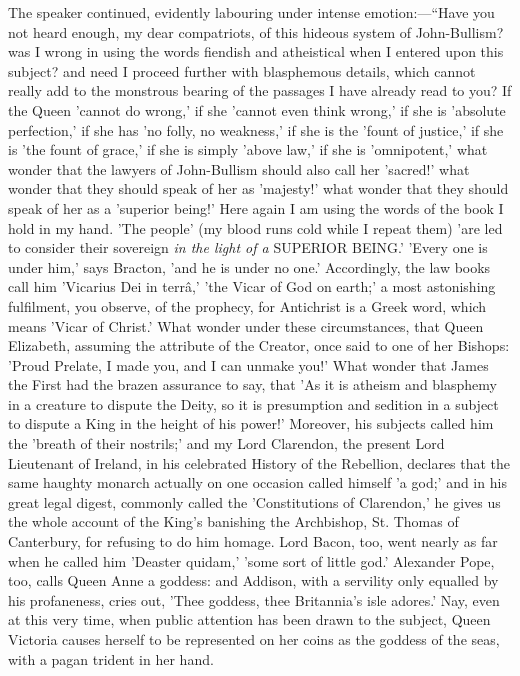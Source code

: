 The speaker continued, evidently labouring under
intense emotion:—``Have you not heard enough, my
dear compatriots, of this hideous system of John-Bullism?
was I wrong in using the words fiendish and atheistical
when I entered upon this subject? and need I proceed
further with blasphemous details, which cannot really add
to the monstrous bearing of the passages I have already
read to you? If the Queen 'cannot do wrong,' if she
'cannot even think wrong,' if she is 'absolute
perfection,' if she has 'no folly, no weakness,' if she
is the 'fount of justice,' if she is 'the fount of
grace,' if she is simply 'above law,' if she is
'omnipotent,' what wonder that the lawyers of
John-Bullism should also call her 'sacred!' what wonder
that they should speak of her as 'majesty!' what wonder
that they should speak of her as a 'superior being!' Here
again I am using the words of the book I hold in my hand.
'The people' (my blood runs cold while I repeat them)
'are led to consider their sovereign \emph{in the light of
a} SUPERIOR BEING.' 'Every one is under him,' says
Bracton, 'and he is under no one.' Accordingly, the law
books call him 'Vicarius Dei in terrâ,' 'the Vicar of
God on earth;' a most astonishing fulfilment, you
observe, of the prophecy, for Antichrist is a Greek word,
which means 'Vicar of Christ.' What wonder under these
circumstances, that Queen Elizabeth, assuming the
attribute of the Creator, once said to one of her
Bishops: 'Proud Prelate, I made you, and I can unmake you!' What wonder that James the First had the brazen
assurance to say, that 'As it is atheism and blasphemy in
a creature to dispute the Deity, so it is presumption and
sedition in a subject to dispute a King in the height of
his power!' Moreover, his subjects called him the 'breath
of their nostrils;' and my Lord Clarendon, the present
Lord Lieutenant of Ireland, in his celebrated History of the Rebellion, declares that the same haughty monarch
actually on one occasion called himself 'a god;' and in
his great legal digest, commonly called the
'Constitutions of Clarendon,' he gives us the whole
account of the King's banishing the Archbishop, St.
Thomas of Canterbury, for refusing to do him homage. Lord
Bacon, too, went nearly as far when he called him
'Deaster quidam,' 'some sort of little god.' Alexander
Pope, too, calls Queen Anne a goddess: and Addison, with
a servility only equalled by his profaneness, cries out, 'Thee goddess, thee Britannia's isle adores.' Nay,
even at this very time, when public attention has been
drawn to the subject, Queen Victoria causes herself to be
represented on her coins as the goddess of the seas, with
a pagan trident in her hand.

